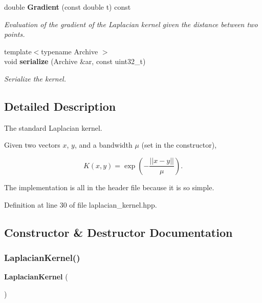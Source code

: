 \begin{DoxyCompactItemize}
double \textbf{ Gradient} (const double t) const
\begin{DoxyCompactList}\small\item\em Evaluation of the gradient of the Laplacian kernel given the distance between two points. \end{DoxyCompactList}\item 
{\footnotesize template$<$typename Archive $>$ }\\void \textbf{ serialize} (Archive \&ar, const uint32\+\_\+t)
\begin{DoxyCompactList}\small\item\em Serialize the kernel. \end{DoxyCompactList}\end{DoxyCompactItemize}


\subsection{Detailed Description}
The standard Laplacian kernel. 

Given two vectors $ x $, $ y $, and a bandwidth $ \mu $ (set in the constructor),

\[ K(x, y) = \exp(-\frac{|| x - y ||}{\mu}). \]

The implementation is all in the header file because it is so simple. 

Definition at line 30 of file laplacian\+\_\+kernel.\+hpp.



\subsection{Constructor \& Destructor Documentation}
\mbox{\label{classmlpack_1_1kernel_1_1LaplacianKernel_a8bfe7f6ab7ae7fc69ef672bd2a8caec8}} 
\subsubsection{Laplacian\+Kernel()\hspace{0.1cm}{\footnotesize\ttfamily [1/2]}}
{\footnotesize\ttfamily \textbf{ Laplacian\+Kernel} (\begin{DoxyParamCaption}{ }\end{DoxyParamCaption})\hspace{0.3cm}{\ttfamily [inline]}}



